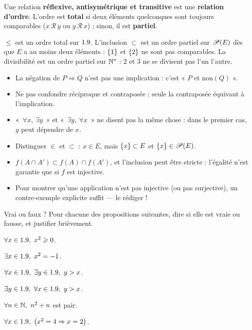 \begin{definition}
Une relation \textbf{réflexive, antisymétrique et transitive} est une
\textbf{relation d'ordre}. L'ordre est \textbf{total} si deux éléments
quelconques sont toujours comparables ($x\,\mathcal{R}\,y$ ou
$y\,\mathcal{R}\,x$) ; sinon, il est \textbf{partiel}.
\end{definition}

\begin{exemple}
$\leq$ est un ordre total sur $1.9$. L'inclusion $\subset$ est un ordre
partiel sur $\mathscr{P}(E)$ dès que $E$ a au moins deux éléments :
$\left\{1\right\}$ et $\left\{2\right\}$ ne sont pas comparables. La divisibilité est un ordre
partiel sur $\mathbb{N}^{*}$ : $2$ et $3$ ne se divisent pas l'un l'autre.
\end{exemple}

\begin{attention}
\begin{itemize}[label={\color{otOrange}\textbullet},leftmargin=1.4em,itemsep=0.6mm,topsep=0.5mm]
  \item La négation de $P\Rightarrow Q$ n'est pas une implication : c'est « $P$ et $\text{non}(Q)$ ».
  \item Ne pas confondre réciproque et contraposée : seule la contraposée équivaut à l'implication.
  \item «~$\forall x,\ \exists y$~» et «~$\exists y,\ \forall x$~» ne disent pas la même chose :
    dans le premier cas, $y$ peut dépendre de $x$.
  \item Distinguer $\in$ et $\subset$ : $x\in E$, mais $\left\{x\right\}\subset E$ et $\left\{x\right\}\in\mathscr{P}(E)$.
  \item $f(A\cap A')\subset f(A)\cap f(A')$, et l'inclusion peut être stricte :
    l'égalité n'est garantie que si $f$ est injective.
  \item Pour montrer qu'une application n'est pas injective (ou pas surjective),
    un contre-exemple explicite suffit — le rédiger !
\end{itemize}
\end{attention}

\exercices
{}

\begin{exercice}[1]{Vrai ou faux ?}
Pour chacune des propositions suivantes, dire si elle est vraie ou fausse,
et justifier brièvement.
\begin{questions}
  \item $\forall x\in1.9,\ x^{2}\geqslant0$.
  \item $\exists x\in1.9,\ x^{2}=-1$.
  \item $\forall x\in\R,\ \exists y\in\R,\ y>x$.
  \item $\exists y\in\R,\ \forall x\in\R,\ y>x$.
  \item $\forall n\in\mathbb{N},\ n^{2}+n$ est pair.
  \item $\forall x\in1.9,\ \bigl(x^{2}=4\Rightarrow x=2\bigr)$.
\end{questions}
\end{exercice}

